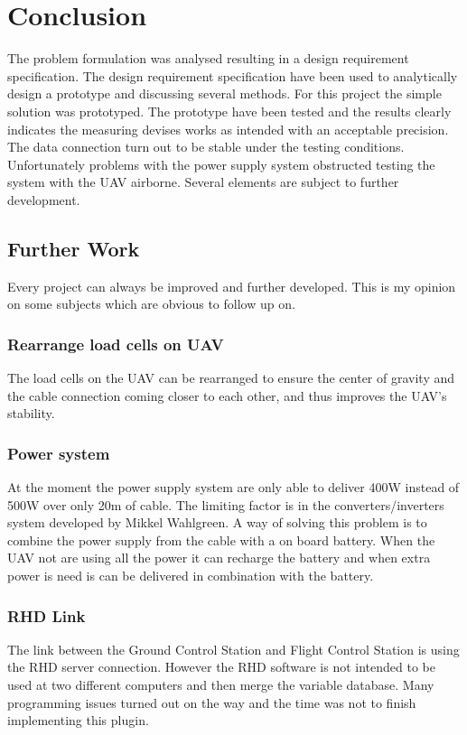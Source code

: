 \chapter{Conclusion}
The problem formulation was analysed resulting in a design requirement specification. The design requirement specification have been used to analytically design a prototype and discussing several methods. For this project the simple solution was prototyped. The prototype have been tested and the results clearly indicates the measuring devises works as intended with an acceptable precision. The data connection turn out to be stable under the testing conditions. Unfortunately problems with the power supply system obstructed testing the system with the UAV airborne.
Several elements are subject to further development.


\section{Further Work}
Every project can always be improved and further developed. This is my opinion on some subjects which are obvious to follow up on.

\subsection*{Rearrange load cells on UAV}
The load cells on the UAV can be rearranged to ensure the center of gravity and the cable connection coming closer to each other, and thus improves the UAV's stability.


\subsection*{Power system}
At the moment the power supply system are only able to deliver 400W instead of 500W over only 20m of cable. The limiting factor is in the converters/inverters system developed by Mikkel Wahlgreen. A way of solving this problem is to combine the power supply from the cable with a on board battery. When the UAV not are using all the power it can recharge the battery and when extra power is need is can be delivered in combination with the battery.

\subsection{RHD Link}
The link between the Ground Control Station and Flight Control Station is using the RHD server connection. However the RHD software is not intended to be used at two different computers and then merge the variable database. Many programming issues turned out on the way and the time was not to finish implementing this plugin.  

